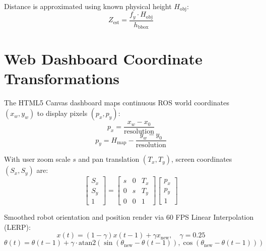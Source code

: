 \documentclass[10pt,a4paper]{article}
\begin{document}
Distance is approximated using known physical height $H_{\text{obj}}$:
\begin{equation}
Z_{\text{est}} = \frac{f_y \cdot H_{\text{obj}}}{h_{\text{bbox}}}
\end{equation}

\section{Web Dashboard Coordinate Transformations}

The HTML5 Canvas dashboard maps continuous ROS world coordinates $(x_w, y_w)$ to display pixels $(p_x, p_y)$:
\begin{equation}
p_x = \frac{x_w - x_0}{\text{resolution}}
\end{equation}
\begin{equation}
p_y = H_{\text{map}} - \frac{y_w - y_0}{\text{resolution}}
\end{equation}

With user zoom scale $s$ and pan translation $(T_x, T_y)$, screen coordinates $(S_x, S_y)$ are:
\begin{equation}
\begin{bmatrix} S_x \\ S_y \\ 1 \end{bmatrix} = \begin{bmatrix} s & 0 & T_x \\ 0 & s & T_y \\ 0 & 0 & 1 \end{bmatrix} \begin{bmatrix} p_x \\ p_y \\ 1 \end{bmatrix}
\end{equation}

Smoothed robot orientation and position render via 60 FPS Linear Interpolation (LERP):
\begin{equation}
x(t) = (1 - \gamma) x(t-1) + \gamma x_{\text{new}}, \quad \gamma = 0.25
\end{equation}
\begin{equation}
\theta(t) = \theta(t-1) + \gamma \cdot \text{atan2}\left(\sin(\theta_{\text{new}} - \theta(t-1)), \cos(\theta_{\text{new}} - \theta(t-1))\right)
\end{equation}
\end{document}

